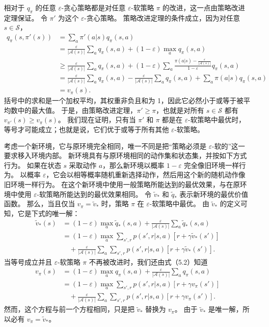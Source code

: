 \documentclass[UTF8, 12pt, fontset=fandol, oneside]{ctexart}
\begin{document}
相对于 $q_\pi$ 的任意 $\varepsilon$-贪心策略都是对任意 $\varepsilon$-软策略 $\pi$ 的改进，这一点由策略改进定理保证。
令 $\pi'$ 为这个 $\varepsilon$-贪心策略。
策略改进定理的条件成立，因为对任意 $s\in\mathcal{S}$，
\begin{equation}
\begin{aligned}
q_\pi(s,\pi'(s))
&= \sum_a \pi'(a|s)q_\pi(s,a)\\
&= \frac{\varepsilon}{|\mathcal{A}(s)|}\sum_a q_\pi(s,a)
 +(1-\varepsilon)\max_a q_\pi(s,a)\\
&\ge
\frac{\varepsilon}{|\mathcal{A}(s)|}\sum_a q_\pi(s,a)
 +(1-\varepsilon)\sum_a
\frac{\pi(a|s)-\frac{\varepsilon}{|\mathcal{A}(s)|}}{1-\varepsilon}
 q_\pi(s,a)\\
&= \frac{\varepsilon}{|\mathcal{A}(s)|}\sum_a q_\pi(s,a)
- \frac{\varepsilon}{|\mathcal{A}(s)|}\sum_a q_\pi(s,a)
+ \sum_a \pi(a|s)q_\pi(s,a)\\
&= v_\pi(s).
\end{aligned}
\end{equation}
括号中的求和是一个加权平均，其权重非负且和为 1，因此它必然小于或等于被平均数中的最大值。
于是，由策略改进定理，$\pi'\ge \pi$，也就是对所有 $s\in\mathcal{S}$ 都有 $v_{\pi'}(s)\ge v_\pi(s)$。
我们现在证明，只有当 $\pi'$ 和 $\pi$ 都是在 $\varepsilon$-软策略中最优时，等号才可能成立；也就是说，它们优于或等于所有其他 $\varepsilon$-软策略。

考虑一个新环境，它与原环境完全相同，唯一不同是把“策略必须是 $\varepsilon$-软的”这一要求移入环境内部。
新环境具有与原环境相同的动作集和状态集，并按如下方式行为。
如果在状态 $s$ 采取动作 $a$，那么新环境以概率 $1-\varepsilon$ 完全像旧环境一样行为。
以概率 $\varepsilon$，它会以相等概率随机重新选择动作，然后用这个新的随机动作像旧环境一样行为。
在这个新环境中使用一般策略所能达到的最优效果，与在原环境中使用 $\varepsilon$-软策略所能达到的最优效果相同。
令 $\tilde v_*$ 和 $\tilde q_*$ 表示新环境的最优价值函数。
那么，当且仅当 $v_\pi=\tilde v_*$ 时，策略 $\pi$ 在 $\varepsilon$-软策略中最优。
由 $\tilde v_*$ 的定义可知，它是下式的唯一解：
\[
\begin{aligned}
\tilde v_*(s)
&= (1-\varepsilon)\max_a \tilde q_*(s,a)
 + \frac{\varepsilon}{|\mathcal{A}(s)|}\sum_a \tilde q_*(s,a)\\
&= (1-\varepsilon)\max_a \sum_{s',r}p(s',r|s,a)\left[r+\gamma\tilde v_*(s')\right]\\
&\quad + \frac{\varepsilon}{|\mathcal{A}(s)|}\sum_a\sum_{s',r}
p(s',r|s,a)\left[r+\gamma\tilde v_*(s')\right].
\end{aligned}
\]
当等号成立并且 $\varepsilon$-软策略 $\pi$ 不再被改进时，我们还由式（5.2）知道
\[
\begin{aligned}
v_\pi(s)
&= (1-\varepsilon)\max_a q_\pi(s,a)
 + \frac{\varepsilon}{|\mathcal{A}(s)|}\sum_a q_\pi(s,a)\\
&= (1-\varepsilon)\max_a \sum_{s',r}p(s',r|s,a)\left[r+\gamma v_\pi(s')\right]\\
&\quad + \frac{\varepsilon}{|\mathcal{A}(s)|}\sum_a\sum_{s',r}
p(s',r|s,a)\left[r+\gamma v_\pi(s')\right].
\end{aligned}
\]
然而，这个方程与前一个方程相同，只是把 $\tilde v_*$ 替换为 $v_\pi$。
由于 $\tilde v_*$ 是唯一解，所以必有 $v_\pi=\tilde v_*$。
\end{document}

